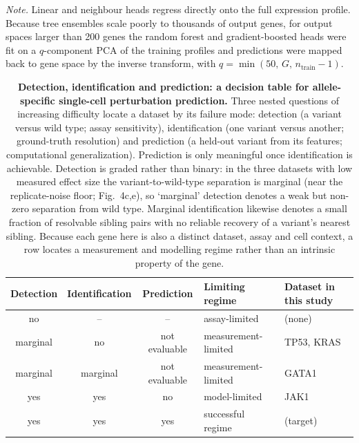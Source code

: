 \documentclass[11pt,letterpaper]{article}
\begin{document}
\noindent\textit{Note.} Linear and neighbour heads regress directly onto the full expression profile. Because tree ensembles scale poorly to thousands of output genes, for output spaces larger than 200 genes the random forest and gradient-boosted heads were fit on a $q$-component PCA of the training profiles and predictions were mapped back to gene space by the inverse transform, with $q = \min(50,\, G,\, n_{\mathrm{train}} - 1)$.


\begin{table}[H]
\centering
\caption{\textbf{Detection, identification and prediction: a decision table for allele-specific single-cell perturbation prediction.} Three nested questions of increasing difficulty locate a dataset by its failure mode: detection (a variant versus wild type; assay sensitivity), identification (one variant versus another; ground-truth resolution) and prediction (a held-out variant from its features; computational generalization). Prediction is only meaningful once identification is achievable. Detection is graded rather than binary: in the three datasets with low measured effect size the variant-to-wild-type separation is marginal (near the replicate-noise floor; Fig.~4c,e), so `marginal' detection denotes a weak but non-zero separation from wild type. Marginal identification likewise denotes a small fraction of resolvable sibling pairs with no reliable recovery of a variant's nearest sibling. Because each gene here is also a distinct dataset, assay and cell context, a row locates a measurement and modelling regime rather than an intrinsic property of the gene.}
\label{stab:decision}
\small
\begin{tabular}{@{}c c c l l@{}}
\toprule
Detection & Identification & Prediction & Limiting regime & Dataset in this study \\
\midrule
no  & --            & --            & assay-limited              & (none) \\
marginal & no        & not evaluable  & measurement-limited         & TP53, KRAS \\
marginal & marginal   & not evaluable  & measurement-limited         & GATA1 \\
yes & yes            & no             & model-limited              & JAK1 \\
yes & yes            & yes            & successful regime          & (target) \\
\bottomrule
\end{tabular}
\end{table}
\end{document}
